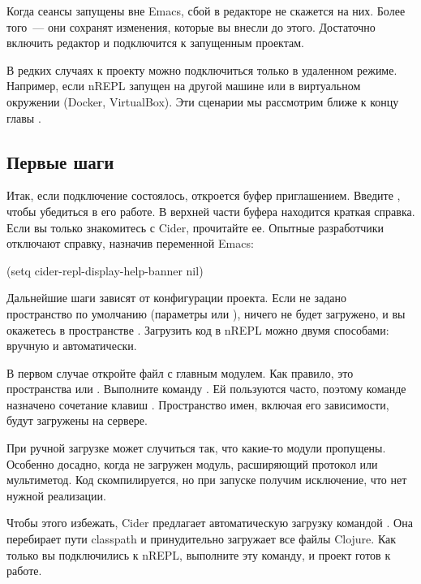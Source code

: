 Когда сеансы запущены вне Emacs, сбой в редакторе не скажется на них. Более того~--- они сохранят изменения, которые вы внесли до этого. Достаточно включить редактор и подключится к запущенным проектам.

В редких случаях к проекту можно подключиться только в удаленном режиме. Например, если nREPL запущен на другой машине или в виртуальном окружении (Docker, VirtualBox). Эти сценарии мы рассмотрим ближе к концу главы .

\subsection{Первые шаги}

Итак, если подключение состоялось, откроется буфер  приглашением. Введите , чтобы убедиться в его работе. В верхней части буфера находится краткая справка. Если вы только знакомитесь с Cider, прочитайте ее. Опытные разработчики отключают справку, назначив  переменной Emacs:

\begin{english}
  \begin{lisp}
(setq cider-repl-display-help-banner nil)
  \end{lisp}
\end{english}

Дальнейшие шаги зависят от конфигурации проекта. Если не задано пространство по умолчанию (параметры  или  \arr {}), ничего не будет загружено, и вы окажетесь в пространстве . Загрузить код в nREPL можно двумя способами: вручную и автоматически.

В первом случае откройте файл с главным модулем. Как правило, это пространства  или . Выполните команду . Ей пользуются часто, поэтому команде назначено сочетание клавиш . Пространство имен, включая его зависимости, будут загружены на сервере.

При ручной загрузке может случиться так, что какие-то модули пропущены. Особенно досадно, когда не загружен модуль, расширяющий протокол или мультиметод. Код скомпилируется, но при запуске получим исключение, что нет нужной реализации.

Чтобы этого избежать, Cider предлагает автоматическую загрузку командой . Она перебирает пути classpath и принудительно загружает все файлы Clojure. Как только вы подключились к nREPL, выполните эту команду, и проект готов к работе.

